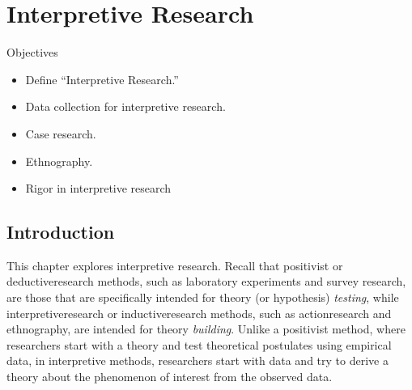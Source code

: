 \chapter{Interpretive Research}\label{ch13:interpretive_research}

\begin{center}
	\begin{objbox}{Objectives}
		\begin{itemize}
			\setlength{\itemsep}{0pt}
			\setlength{\parskip}{0pt}
			\setlength{\parsep}{0pt}
			
			\item Define ``Interpretive Research.''
			\item Data collection for interpretive research.
			\item Case research.
			\item Ethnography.
			\item Rigor in interpretive research
		\end{itemize}
	\end{objbox}
\end{center}

\section{Introduction}

This chapter explores interpretive research. Recall that \gls{positivist} or \gls{deductiveresearch} methods, such as laboratory experiments and survey research, are those that are specifically intended for \gls{theory} (or \gls{hypothesis}) \textit{testing}, while \gls{interpretiveresearch} or \gls{inductiveresearch} methods, such as \gls{actionresearch} and \gls{ethnography}, are intended for theory \textit{building}. Unlike a positivist method, where researchers start with a theory and test theoretical postulates using empirical data, in interpretive methods, researchers start with data and try to derive a theory about the phenomenon of interest from the observed data.

